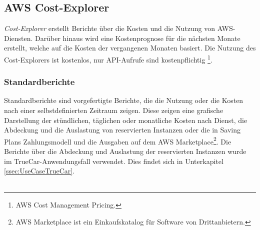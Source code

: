 \subsection{AWS Cost-Explorer}\label{ssec:Cost-Explorer}
\textit{Cost-Explorer} erstellt Berichte über die Kosten und die Nutzung von AWS-Diensten. Darüber hinaus wird eine Kostenprognose für die nächsten Monate erstellt, welche auf die Kosten der vergangenen Monaten basiert. Die Nutzung des Cost-Explorers ist kostenlos, nur API-Aufrufe sind kostenpflichtig \footnote{{AWS Cost Management Pricing\cite{AMZ22}.}}.
\subsubsection*{Standardberichte}
Standardberichte sind vorgefertigte Berichte, die die Nutzung oder die Kosten nach einer selbstdefinierten Zeitraum zeigen. Diese zeigen eine grafische Darstellung der stündlichen, täglichen oder monatliche Kosten nach Dienst, die Abdeckung und die Auslastung von reservierten Instanzen oder die in Saving Plans Zahlungsmodell und die Ausgaben auf dem AWS Marketplace\footnote{{AWS Marketplace ist ein Einkaufskatalog für Software von Drittanbietern\cite{AMZ34}.}}. Die Berichte über die Abdeckung und Auslastung der reservierten Instanzen wurde im TrueCar-Anwendungsfall verwendet. Dies findet sich in Unterkapitel \ref{ssec:UseCaseTrueCar}.
\\\\
